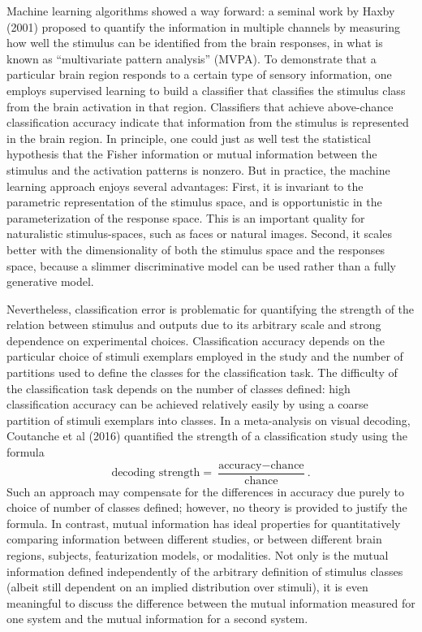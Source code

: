 \documentclass[12pt]{article}
\begin{document}
Machine learning algorithms showed a way forward: a seminal work
by Haxby (2001) proposed to quantify the information in multiple
channels by measuring how well the stimulus can be identified from the
brain responses, in what is known as ``multivariate pattern analysis''
(MVPA). To demonstrate that a particular brain region responds to a
certain type of sensory information, one employs supervised learning
to build a classifier that classifies the stimulus class from the
brain activation in that region. Classifiers that achieve above-chance
classification accuracy indicate that information from the stimulus is
represented in the brain region. In principle, one could just as well
test the statistical hypothesis that the Fisher information or mutual
information between the stimulus and the activation patterns is
nonzero. But in practice, the machine learning approach enjoys several
advantages: First, it is invariant to the parametric representation of
the stimulus space, and is opportunistic in the parameterization of
the response space. This is an important quality for naturalistic
stimulus-spaces, such as faces or natural images. Second, it scales
better with the dimensionality of both the stimulus space and the
responses space, because a slimmer discriminative model can be used
rather than a fully generative model.

Nevertheless, classification error is problematic for quantifying the
strength of the relation between stimulus and outputs due to its
arbitrary scale and strong dependence on experimental
choices. Classification accuracy depends on the particular choice of
stimuli exemplars employed in the study and the number of partitions
used to define the classes for the classification task. The difficulty
of the classification task depends on the number of classes defined:
high classification accuracy can be achieved relatively easily by
using a coarse partition of stimuli exemplars into classes. In a
meta-analysis on visual decoding, Coutanche et al (2016) quantified
the strength of a classification study using the formula
\[
\text{decoding strength} = \frac{\text{accuracy} - \text{chance}}{\text{chance}}.
\]
Such an approach may compensate for the differences in accuracy due
purely to choice of number of classes defined; however, no theory is
provided to justify the formula. In contrast, mutual information has
ideal properties for quantitatively comparing information between
different studies, or between different brain regions, subjects,
featurization models, or modalities. Not only is the mutual
information defined independently of the arbitrary definition of
stimulus classes (albeit still dependent on an implied distribution
over stimuli), it is even meaningful to discuss the difference between
the mutual information measured for one system and the mutual
information for a second system.
\end{document}
